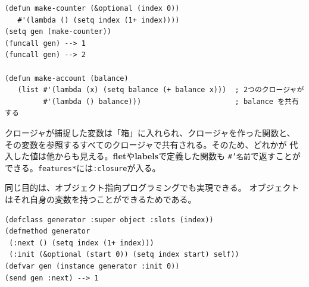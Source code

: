 \begin{verbatim}
(defun make-counter (&optional (index 0))
   #'(lambda () (setq index (1+ index))))
(setq gen (make-counter))
(funcall gen) --> 1
(funcall gen) --> 2

(defun make-account (balance)
   (list #'(lambda (x) (setq balance (+ balance x)))  ; 2つのクロージャが
         #'(lambda () balance)))                      ; balance を共有する
\end{verbatim}

クロージャが捕捉した変数は「箱」に入れられ、クロージャを作った関数と、
その変数を参照するすべてのクロージャで共有される。そのため、どれかが
代入した値は他からも見える。{\bf flet}や{\bf labels}で定義した関数も
{\tt \#'名前}で返すことができる。{\tt *features*}には{\tt :closure}が入る。

同じ目的は、オブジェクト指向プログラミングでも実現できる。
オブジェクトはそれ自身の変数を持つことができるためである。
\begin{verbatim}
(defclass generator :super object :slots (index))
(defmethod generator
 (:next () (setq index (1+ index)))
 (:init (&optional (start 0)) (setq index start) self))
(defvar gen (instance generator :init 0))
(send gen :next) --> 1
\end{verbatim}


\newpage
